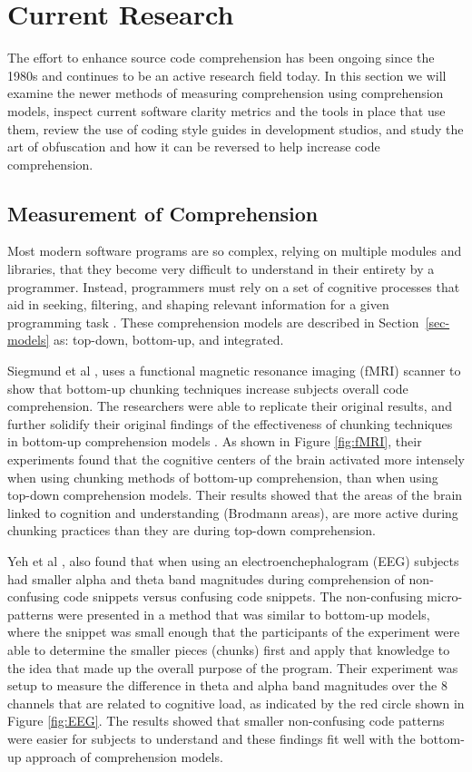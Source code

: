 \section{Current Research}\label{sec-current}
The effort to enhance source code comprehension has been ongoing since the 
1980s \cite{brooks_towards_1983,letovsky_cognitive_1987} and continues to be an active research field today. In this section we will examine the newer methods of measuring comprehension using comprehension models, inspect current software clarity metrics and the tools in place that use them, review the use of coding style guides in development studios, and study the art of obfuscation and how it can be reversed to help increase code comprehension.

\subsection{Measurement of Comprehension}
Most modern software programs are so complex, relying on multiple modules and libraries, that they become very difficult to understand in their entirety by a programmer. Instead, programmers must rely on a set of cognitive processes that aid in seeking, filtering, and
shaping relevant information for a given programming task \cite{siegmund_measuring_2017}. These comprehension models are described in Section~\ref{sec-models} as: top-down, bottom-up, and integrated.

Siegmund et al \cite{siegmund_understanding_2014}, uses a functional magnetic resonance imaging (fMRI)
scanner to show that bottom-up chunking techniques increase subjects overall code comprehension. The
researchers were able to replicate their original results, and further solidify their original findings of
the effectiveness of chunking techniques in bottom-up comprehension models \cite{siegmund_measuring_2017,
siegmund_understanding_2014}. As shown in Figure \ref{fig:fMRI}, their experiments found that the 
cognitive centers of the brain activated more intensely when using chunking methods of bottom-up
comprehension, than when using top-down comprehension models. Their results showed that the areas of the
brain linked to cognition and understanding (Brodmann areas), are more active during chunking practices
than they are during top-down comprehension. 

Yeh et al \cite{yeh_detecting_2017}, also found that when using an electroenchephalogram (EEG) subjects
had smaller alpha and theta band magnitudes during comprehension of non-confusing code snippets versus
confusing code snippets. The non-confusing micro-patterns were presented in a method that was similar to
bottom-up models, where the snippet was small enough that the participants of the experiment were able to
determine the smaller pieces (chunks) first and apply that knowledge to the idea that made up the overall
purpose of the program. Their experiment was setup to measure the difference in theta and alpha band
magnitudes over the 8 channels that are related to cognitive load, as indicated by the red circle shown in
Figure \ref{fig:EEG}. The results showed that smaller non-confusing code patterns were easier for subjects
to understand and these findings fit well with the bottom-up approach of comprehension models.

